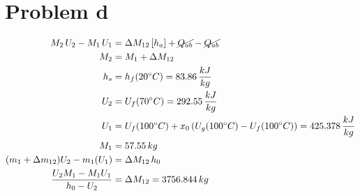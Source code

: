 \section*{Problem d}

\begin{align*}
M_2 \, U_2 - M_1 \, U_1 &= \Delta M_{12} \, [h_a] + \cancel{Q_{ab}} - \cancel{Q_{ab}} \\
M_2 &= M_1 + \Delta M_{12} \\
h_s &= h_f(20^\circ C) = 83.86 \, \frac{kJ}{kg} \\
U_2 &= U_f(70^\circ C) = 292.55 \, \frac{kJ}{kg} \\
U_1 &= U_f(100^\circ C) + x_0 \left( U_g(100^\circ C) - U_f(100^\circ C) \right) = 425.378 \, \frac{kJ}{kg} \\
M_1 &= 57.55 \, kg \\
(m_1 + \Delta m_{12}) U_2 - m_1 (U_1) &= \Delta M_{12} \, h_0 \\
\frac{U_2 M_1 - M_1 U_1}{h_0 - U_2} &= \Delta M_{12} = 3756.844 \, kg
\end{align*}